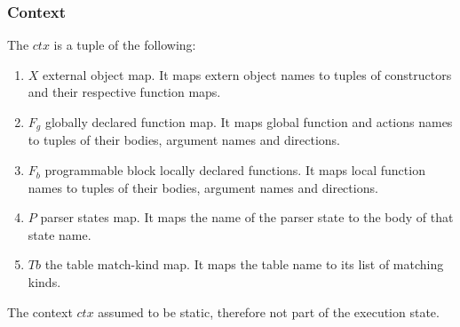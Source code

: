 \documentclass[UTF8]{article}
\begin{document}
\subsubsection*{Context}
 The $ctx$ is a tuple of the following: 
\begin{enumerate}
   \item $X$ external object map. It maps extern object names to tuples of constructors and their respective function maps.
   \item $F_g$ globally declared function map. It maps global function and actions names to tuples of their bodies, argument names and directions. 
   \item $F_b$ programmable block locally declared functions.  It maps local function names to tuples of their bodies, argument names and directions. 
   \item $P$ parser states map. It maps the name of the parser state to the body of that state name.
   \item $Tb$ the table match-kind map. It maps the table name to its list of matching kinds.
\end{enumerate}

The context $ctx$ assumed to be static, therefore not part of the execution state.




\newpage
\end{document}
